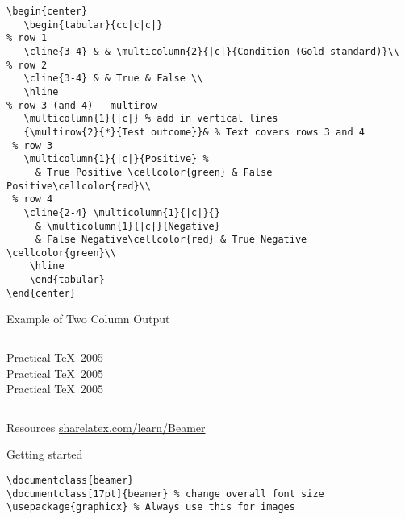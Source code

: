 \documentclass{beamer}
\begin{document}
    \begin{verbatim}
\begin{center}
   \begin{tabular}{cc|c|c|}
% row 1
   \cline{3-4} & & \multicolumn{2}{|c|}{Condition (Gold standard)}\\
% row 2
   \cline{3-4} & & True & False \\
   \hline
% row 3 (and 4) - multirow
   \multicolumn{1}{|c|} % add in vertical lines
   {\multirow{2}{*}{Test outcome}}& % Text covers rows 3 and 4
 % row 3
   \multicolumn{1}{|c|}{Positive} %
     & True Positive \cellcolor{green} & False Positive\cellcolor{red}\\
 % row 4
   \cline{2-4} \multicolumn{1}{|c|}{}
     & \multicolumn{1}{|c|}{Negative}
     & False Negative\cellcolor{red} & True Negative \cellcolor{green}\\
    \hline
    \end{tabular}
\end{center}
    \end{verbatim}

\begin{frame}{Example of Two Column Output}
    \begin{columns}[c]
        \column{1.5in}
            Practical \TeX\ 2005\\
            Practical \TeX\ 2005\\
            Practical \TeX\ 2005
        \column{1.5in}
    \end{columns}
\end{frame}%
\begin{frame}{Resources}
    \url{sharelatex.com/learn/Beamer}
\end{frame}
\begin{frame}[fragile=singleslide]{Getting started}
\begin{verbatim}
\documentclass{beamer}
\documentclass[17pt]{beamer} % change overall font size
\usepackage{graphicx} % Always use this for images
\end{verbatim}
\end{frame}
\end{document}
